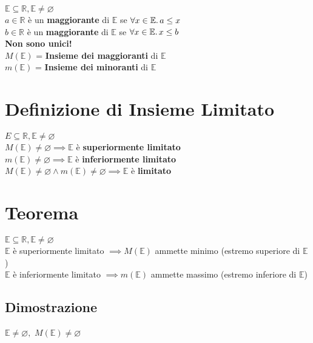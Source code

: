 \documentclass[a4paper, twoside, italian, 11pt]{book}
\newcommand{\R}{\mathbb{R}}
\newcommand{\E}{\mathbb{E}}
\let\emptyset\varnothing
\begin{document}
\noindent
$\E \subseteq \R, \E \neq \emptyset$ \\

$a \in \R$ è un \textbf{maggiorante} di $\E$ se $\forall x \in \E \ldotp a \leq x$ \\

$b \in \R$ è un \textbf{maggiorante} di $\E$ se $\forall x \in \E \ldotp x \leq b$ \\

\noindent
\textbf{Non sono unici!} \\

\noindent
$M(\E)$ = \textbf{Insieme dei maggioranti} di $\E$\\
$m(\E)$ = \textbf{Insieme dei minoranti} di $\E$



\section{Definizione di Insieme Limitato}

\noindent
$E \subseteq \R, \E \neq \emptyset$ \\

$M(\E) \neq \emptyset \implies \E$ è \textbf{superiormente limitato} \\
\indent
$m(\E) \neq \emptyset \implies \E$ è \textbf{inferiormente limitato} \\
\indent
$M(\E) \neq \emptyset \land m(\E) \neq \emptyset \implies \E$ è \textbf{limitato}



\section{Teorema}

\noindent
$\E \subseteq \R, \E \neq \emptyset$ \\

\noindent
$\E$ è superiormente limitato $\implies M(\E)$ ammette minimo (estremo superiore di $\E$) \\

\noindent
$\E$ è inferiormente limitato $\implies m(\E)$ ammette massimo (estremo inferiore di $\E$)


\subsection{Dimostrazione}

\noindent
$\E \neq \emptyset,$ $M(\E) \neq \emptyset$ \\
\end{document}
